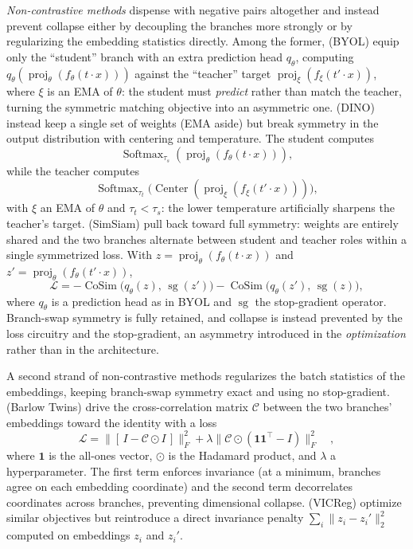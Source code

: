 \documentclass[mathematics,review,submit,moreauthors]{Definitions/mdpi}
\begin{document}
\emph{Non-contrastive methods} dispense with negative pairs altogether and instead prevent collapse either by decoupling the branches more strongly or by regularizing the embedding statistics directly.
Among the former, \citet{grill2020} (BYOL) equip only the ``student'' branch with an extra prediction head $q_\theta$, computing $q_\theta(\operatorname{proj}_\theta(f_\theta(t\cdot x)))$ against the ``teacher'' target $\operatorname{proj}_\xi(f_\xi(t'\cdot x))$, where $\xi$ is an EMA of $\theta$: the student must \emph{predict} rather than match the teacher, turning the symmetric matching objective into an asymmetric one.
\citet{caron2021} (DINO) instead keep a single set of weights (EMA aside) but break symmetry in the output distribution with centering and temperature.
The student computes
\[
    \operatorname{Softmax}_{\tau_s}(\operatorname{proj}_{\theta}(f_\theta(t\cdot x))),
\]
while the teacher computes
\[
    \operatorname{Softmax}_{\tau_t}
    \bigl(\operatorname{Center}(\operatorname{proj}_{\xi}(f_\xi(t'\cdot x)))\bigr),
\]
with $\xi$ an EMA of $\theta$ and $\tau_t<\tau_s$: the lower temperature artificially sharpens the teacher's target.
\citet{chen2020a} (SimSiam) pull back toward full symmetry: weights are entirely shared and the two branches alternate between student and teacher roles within a single symmetrized loss.
With $z=\operatorname{proj}_\theta(f_\theta(t\cdot x))$ and $z'=\operatorname{proj}_\theta(f_\theta(t'\cdot x))$,
\[
\mathcal{L}=-\operatorname{CoSim}\big(q_\theta(z),\,\operatorname{sg}(z')\big)-\operatorname{CoSim}\big(q_\theta(z'),\,\operatorname{sg}(z)\big),
\]
where $q_\theta$ is a prediction head as in BYOL and $\operatorname{sg}$ the stop-gradient operator.
Branch-swap symmetry is fully retained, and collapse is instead prevented by the loss circuitry and the stop-gradient, an asymmetry introduced in the \emph{optimization} rather than in the architecture.

A second strand of non-contrastive methods regularizes the batch statistics of the embeddings, keeping branch-swap symmetry exact and using no stop-gradient.
\citet{zbontar2021p3icml} (Barlow Twins) drive the cross-correlation matrix $\mathcal{C}$ between the two branches' embeddings toward the identity with a loss
\[
\mathcal{L}=\big\|[\,I-\mathcal{C}\odot I\,]\big\|_F^2+\lambda\big\|\mathcal{C}\odot(\boldsymbol 1\boldsymbol 1^\top-I)\big\|_F^2\quad ,
\]
where $\boldsymbol{1}$ is the all-ones vector, $\odot$ is the Hadamard product, and $\lambda$ a hyperparameter.
The first term enforces invariance (at a minimum, branches agree on each embedding coordinate) and the second term decorrelates coordinates across branches, preventing dimensional collapse.
\citet{bardes2022} (VICReg) optimize similar objectives but reintroduce a direct invariance penalty $\sum_i \lVert z_i-z_i'\rVert_2^2$ computed on embeddings $z_i$ and $z_i'$. 
\end{document}
